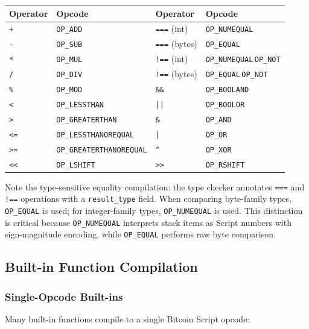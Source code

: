 \documentclass[11pt,a4paper]{article}
\newcommand{\op}[1]{\texttt{OP\_#1}}
\begin{document}
\begin{center}
\small
\begin{tabular}{@{}ll@{\qquad}ll@{}}
\toprule
\textbf{Operator} & \textbf{Opcode} & \textbf{Operator} & \textbf{Opcode} \\
\midrule
\texttt{+} & \op{ADD} & \texttt{===} (int) & \op{NUMEQUAL} \\
\texttt{-} & \op{SUB} & \texttt{===} (bytes) & \op{EQUAL} \\
\texttt{*} & \op{MUL} & \texttt{!==} (int) & \op{NUMEQUAL}\,\op{NOT} \\
\texttt{/} & \op{DIV} & \texttt{!==} (bytes) & \op{EQUAL}\,\op{NOT} \\
\texttt{\%} & \op{MOD} & \texttt{\&\&} & \op{BOOLAND} \\
\texttt{<} & \op{LESSTHAN} & \texttt{||} & \op{BOOLOR} \\
\texttt{>} & \op{GREATERTHAN} & \texttt{\&} & \op{AND} \\
\texttt{<=} & \op{LESSTHANOREQUAL} & \texttt{|} & \op{OR} \\
\texttt{>=} & \op{GREATERTHANOREQUAL} & \texttt{\^{}} & \op{XOR} \\
\texttt{<<} & \op{LSHIFT} & \texttt{>>} & \op{RSHIFT} \\
\bottomrule
\end{tabular}
\end{center}

Note the type-sensitive equality compilation: the type checker annotates
\texttt{===} and \texttt{!==} operations with a \texttt{result\_type} field.
When comparing byte-family types, \op{EQUAL} is used; for integer-family
types, \op{NUMEQUAL} is used. This distinction is critical because
\op{NUMEQUAL} interprets stack items as Script numbers with sign-magnitude
encoding, while \op{EQUAL} performs raw byte comparison.

\subsection{Built-in Function Compilation}
\label{sec:codegen-builtins}

\subsubsection{Single-Opcode Built-ins}

Many built-in functions compile to a single Bitcoin Script opcode:
\end{document}
